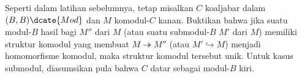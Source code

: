 	\item Seperti dalam latihan sebelumnya, tetap misalkan $C$ koaljabar dalam
	$(B,B)\dcate{Mod}$ dan $M$ komodul-$C$ kanan. Buktikan bahwa jika suatu
	modul-$B$ hasil bagi $M''$ dari $M$ (atau suatu submodul-$B$ $M'$ dari
	$M$) memiliki struktur komodul yang membuat
	$M\twoheadrightarrow M''$ (atau $M'\hookrightarrow M$) menjadi
	homomorfisme komodul, maka struktur komodul tersebut unik. Untuk kasus
	submodul, diasumsikan pula bahwa $C$ datar sebagai modul-$B$ kiri.
